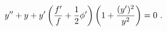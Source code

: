 \begin{equation}
y''+ y +y'\left( {f'\over f}+{1\over 2}\phi'\right) 
\left( 1+ {(y')^2\over
y^2}\right)=0\label{eqwil}\ .
\end{equation}

